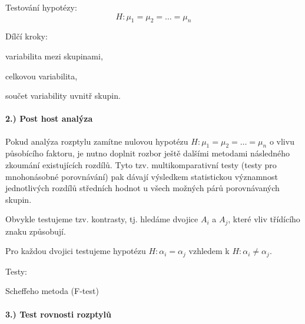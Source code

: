 \begin{compactitem}
    \item Testování hypotézy:
    $$ H : \mu_1 = \mu_2 = \ldots = \mu_n $$

    \item Dílčí kroky: \begin{compactitem}
        \item variabilita mezi skupinami,
        \item celkovou variabilita,
        \item součet variability uvnitř skupin.
    \end{compactitem}
\end{compactitem}

\paragraph*{2.) Post host analýza}

\begin{compactitem}
    \item Pokud analýza rozptylu zamítne nulovou hypotézu $ H : \mu_1 = \mu_2 = \ldots = \mu_n $ o vlivu působícího faktoru, je nutno doplnit rozbor ještě dalšími metodami následného zkoumání existujících rozdílů. Tyto tzv. multikomparativní testy (testy pro mnohonásobné porovnávání) pak dávají výsledkem statistickou významnost jednotlivých rozdílů středních hodnot u všech možných párů porovnávaných skupin.

    \item Obvykle testujeme tzv. kontrasty, tj. hledáme dvojice $A_i$ a $A_j$, které vliv třídícího znaku způsobují.

    \item Pro každou dvojici testujeme hypotézu $ H : \alpha_i = \alpha_j $ vzhledem k $ H : \alpha_i \not= \alpha_j $.

    \item Testy: \begin{compactitem}
        \item Scheffeho metoda (F-test)
    \end{compactitem}
\end{compactitem}

\paragraph*{3.) Test rovnosti rozptylů}


